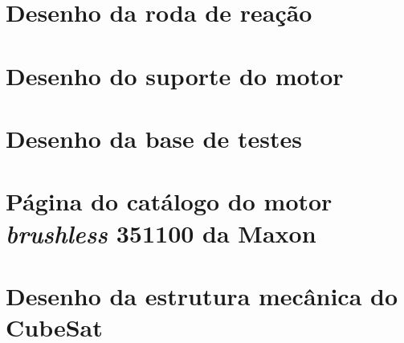 \documentclass[
	12pt,				%
	openany,			%
	twoside,			%
	a4paper,			%
	english,			%
	french,				%
	spanish,			%
	brazil,				%
	oldfontcommands
	]{abntex2}
\begin{document}
\begin{apendicesenv}
\partapendices

\chapter{Desenho da roda de reação}



\label{ap:RW}

\chapter{Desenho do suporte do motor}



\label{ap:MS}

\chapter{Desenho da base de testes}

%

\label{ap:TB}

\end{apendicesenv}

\begin{anexosenv}
\partanexos
\chapter{Página do catálogo do motor \textit{brushless} 351100 da Maxon}



\label{an:MM}

\chapter{Desenho da estrutura mecânica do CubeSat}

\label{an:MS}








\end{anexosenv}
\end{document}
